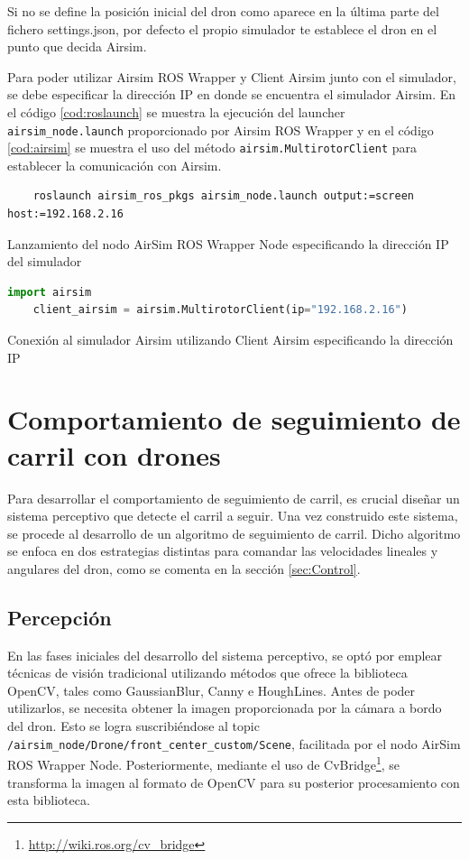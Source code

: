 Si no se define la posición inicial del dron como aparece en la última parte del fichero settings.json, por defecto el propio simulador te establece el dron en el punto que decida Airsim.

Para poder utilizar Airsim ROS Wrapper y Client Airsim junto con el simulador, se debe especificar la dirección IP en donde se encuentra el simulador Airsim. En el código 
\ref{cod:roslaunch} se muestra la ejecución del launcher \texttt{airsim\_node.launch} proporcionado por Airsim ROS Wrapper y en el código \ref{cod:airsim} se muestra el uso del método
\texttt{airsim.MultirotorClient}
para establecer la comunicación con Airsim.

\begin{code}  [H]
  \begin{lstlisting}
    roslaunch airsim_ros_pkgs airsim_node.launch output:=screen host:=192.168.2.16
  \end{lstlisting}
  \caption[comando]{Lanzamiento del nodo AirSim ROS Wrapper Node especificando la dirección IP del simulador}
  \label{cod:roslaunch}
\end{code} 

\begin{code}  [H]
  \begin{lstlisting}[language=Python]
    import airsim
    client_airsim = airsim.MultirotorClient(ip="192.168.2.16")
  \end{lstlisting}
  \caption[comando]{Conexión al simulador Airsim utilizando Client Airsim especificando la dirección IP}
  \label{cod:airsim}
\end{code} 

\section{Comportamiento de seguimiento de carril con drones}
\label{sec:Comportamiento de seguimiento de carril con drones}
Para desarrollar el comportamiento de seguimiento de carril, es crucial diseñar un sistema perceptivo que detecte el carril a seguir. Una vez 
construido este sistema, se procede al desarrollo de un algoritmo de seguimiento de carril. Dicho algoritmo se enfoca en dos estrategias distintas 
para comandar las velocidades lineales y angulares del dron, como se comenta en la sección \ref{sec:Control}. 
\subsection{Percepción}
\label{sec:Percepción}
En las fases iniciales del desarrollo del sistema perceptivo, se optó por emplear técnicas de visión tradicional utilizando métodos que ofrece la biblioteca 
OpenCV, tales como GaussianBlur, Canny e HoughLines. Antes de poder utilizarlos, se necesita obtener la imagen proporcionada por la cámara a bordo del dron. Esto se logra
suscribiéndose al topic \texttt{/airsim\_node/Drone/front\_center\_custom/Scene}, facilitada por el nodo AirSim ROS Wrapper Node. Posteriormente, mediante el uso de 
CvBridge\footnote{\url{http://wiki.ros.org/cv_bridge}}, se transforma la imagen al formato de OpenCV para su posterior procesamiento con esta biblioteca.


